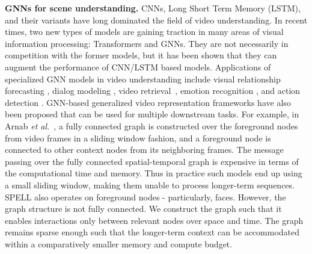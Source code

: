 \documentclass[runningheads]{llncs}
\begin{document}
\textbf{GNNs for scene understanding. }
CNNs, Long Short Term Memory (LSTM), and their variants have long dominated the field of video understanding. In recent times, two new types of models are gaining traction in many areas of visual information processing: Transformers \cite{vaswani2017attention} and GNNs. They are not necessarily in competition with the former models, but it has been shown that they can augment the performance of CNN/LSTM based models. Applications of specialized GNN models in video understanding include visual relationship forecasting \cite{mi2021visual}, dialog modeling \cite{geng2020spatio}, video retrieval~\cite{tan2021logan}, emotion recognition \cite{shirian2020learnable}, and action detection \cite{zhang2019structured}. GNN-based generalized video representation frameworks have also been proposed \cite{arnab2021unified,nagarajan2020ego,patrick2021space} that can be used for multiple downstream tasks. For example, in Arnab \textit{et al.}~\cite{arnab2021unified}, a fully connected graph is constructed over the foreground nodes from video frames in a sliding window fashion, and a foreground node is connected to other context nodes from its neighboring frames. The message passing over the fully connected spatial-temporal graph is expensive in terms of the computational time and memory. Thus in practice such models end up using a small sliding window, making them unable to process longer-term  sequences. SPELL also operates on foreground nodes - particularly, faces. However, the graph structure is not fully connected. We construct the graph such that it enables interactions only between relevant nodes over space and time. The graph remains sparse enough such that the longer-term context can be accommodated within a comparatively smaller memory and compute budget.
\end{document}
